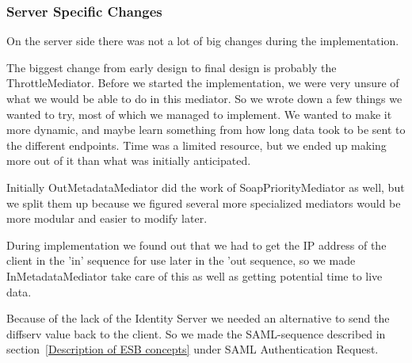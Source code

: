 \subsubsection{Server Specific Changes}\label{Changes:Server}
    On the server side there was not a lot of big changes during the implementation.
    
    The biggest change from early design to final design is probably the ThrottleMediator. Before we started the implementation, we were very unsure of what we would be able to do in this mediator. So we wrote down a few things we wanted to try, most of which we managed to implement. We wanted to make it more dynamic, and maybe learn something from how long data took to be sent to the different endpoints. Time was a limited resource, but we ended up making more out of it than what was initially anticipated.

    Initially OutMetadataMediator did the work of SoapPriorityMediator as well, but we split them up because we figured several more specialized mediators would be more modular and easier to modify later.

    During implementation we found out that we had to get the IP address of the client in the 'in' sequence for use later in the 'out sequence, so we made InMetadataMediator take care of this as well as getting potential time to live data.

    Because of the lack of the Identity Server we needed an alternative to send the diffserv value back to the client. So we made the SAML-sequence described in section~\ref{Description of ESB concepts} under SAML Authentication Request.